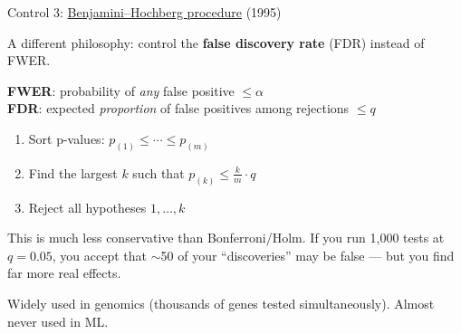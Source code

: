 \documentclass[aspectratio=169,11pt]{beamer}
\begin{document}
\begin{frame}{Control 3: \href{https://en.wikipedia.org/wiki/False_discovery_rate\#Benjamini\%E2\%80\%93Hochberg_procedure}{Benjamini--Hochberg procedure} (1995)}

A different philosophy: control the \textbf{false discovery rate} (FDR) instead of FWER.

\vspace{0.5em}

{\small
\textbf{FWER}: probability of \emph{any} false positive $\leq \alpha$\\
\textbf{FDR}: expected \emph{proportion} of false positives among rejections $\leq q$
}

\vspace{0.5em}

\begin{enumerate}\setlength\itemsep{6pt}
  \item {\small Sort p-values: $p_{(1)} \leq \cdots \leq p_{(m)}$}
  \item {\small Find the largest $k$ such that $p_{(k)} \leq \frac{k}{m} \cdot q$}
  \item {\small Reject all hypotheses $1, \ldots, k$}
\end{enumerate}

\vspace{0.5em}

{\small This is much less conservative than Bonferroni/Holm. If you run 1,000 tests at $q = 0.05$, you accept that $\sim$50 of your ``discoveries'' may be false --- but you find far more real effects.}

\vspace{0.3em}
{\small Widely used in genomics (thousands of genes tested simultaneously). Almost never used in ML.}
\end{frame}
\end{document}
